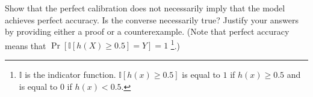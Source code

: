 \item {}
Show that
the perfect calibration does not necessarily imply that the model achieves perfect accuracy. Is the
converse necessarily true? Justify your answers by providing either a proof or a counterexample. (Note that perfect accuracy means that $\Pr[\mathbb{I} [h(X) \ge 0.5] = Y] = 1$ \footnote{$\mathbb{I}$ is the indicator function. $\mathbb{I}[h(x) \ge 0.5]$ is equal to $1$ if $h(x) \ge 0.5$ and is equal to $0$ if $h(x) < 0.5$.}.)

